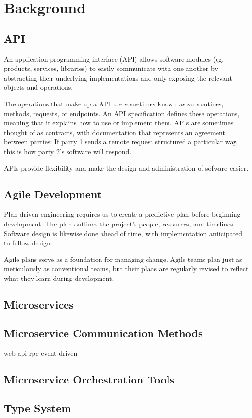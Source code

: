 
%

\chapter{Background}
\label{cha:background}

\section{API} %
\label{sec:api}

An application programming interface (API) allows software modules (eg. products, services, libraries)
to easily communicate with one another by abstracting their underlying implementations and only exposing the relevant objects and operations.

The operations that make up a API are sometimes known as subroutines, methods, requests, or endpoints.
An API specification defines these operations, meaning that it explains how to use or implement them.
APIs are sometimes thought of as contracts, with documentation that represents an agreement between parties:
If party 1 sends a remote request structured a particular way, this is how party 2’s software will respond.

APIs provide flexibility and make the design and administration of sofware  easier.

\section{Agile Development} %
\label{sec:agile_development}

Plan-driven engineering requires us to create a predictive plan before beginning development.
The plan outlines the project's people, resources, and timelines.
Software design is likewise done ahead of time, with implementation anticipated to follow design.

Agile plans serve as a foundation for managing change.
Agile teams plan just as meticulously as conventional teams, but their plans are regularly revised to reflect what they learn during development.

\section{Microservices} %
\label{sec:microservices}

\section{Microservice Communication Methods} %
\label{sec:microservice_communication_methods}
 web api
 rpc
 event driven

\section{Microservice Orchestration Tools} %
\label{sec:microservices}

\section{Type System} %
\label{sec:type_system}
